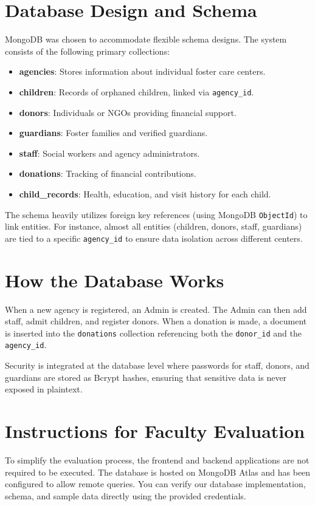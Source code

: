 \documentclass[12pt,a4paper]{article}
\begin{document}
\section{Database Design and Schema}
MongoDB was chosen to accommodate flexible schema designs. The system consists of the following primary collections:

\begin{itemize}
    \item \textbf{agencies}: Stores information about individual foster care centers.
    \item \textbf{children}: Records of orphaned children, linked via \texttt{agency\_id}.
    \item \textbf{donors}: Individuals or NGOs providing financial support.
    \item \textbf{guardians}: Foster families and verified guardians.
    \item \textbf{staff}: Social workers and agency administrators.
    \item \textbf{donations}: Tracking of financial contributions.
    \item \textbf{child\_records}: Health, education, and visit history for each child.
\end{itemize}

The schema heavily utilizes foreign key references (using MongoDB \texttt{ObjectId}) to link entities. For instance, almost all entities (children, donors, staff, guardians) are tied to a specific \texttt{agency\_id} to ensure data isolation across different centers.

\section{How the Database Works}
When a new agency is registered, an Admin is created. The Admin can then add staff, admit children, and register donors. When a donation is made, a document is inserted into the \texttt{donations} collection referencing both the \texttt{donor\_id} and the \texttt{agency\_id}. 

Security is integrated at the database level where passwords for staff, donors, and guardians are stored as Bcrypt hashes, ensuring that sensitive data is never exposed in plaintext.

\section{Instructions for Faculty Evaluation}
To simplify the evaluation process, the frontend and backend applications are not required to be executed. The database is hosted on MongoDB Atlas and has been configured to allow remote queries. You can verify our database implementation, schema, and sample data directly using the provided credentials.
\end{document}
